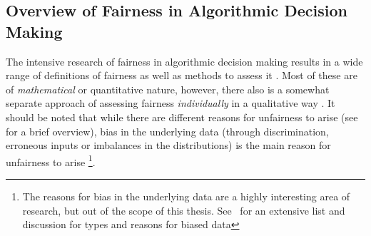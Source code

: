 \subsection{Overview of Fairness in Algorithmic Decision Making}\label{subsec:overview}

The intensive research of fairness in algorithmic decision making results in a wide range of definitions of fairness as well as methods to assess it \parencite{CorbettDavies2023}.
Most of these are of \textit{mathematical} or quantitative nature, however, there also is a somewhat separate approach of assessing fairness \textit{individually} in a qualitative way \parencite{Chouldechova2018}.
It should be noted that while there are different reasons for unfairness to arise (see~\cite{Chouldechova2018} for a brief overview), bias in the underlying data (through discrimination, erroneous inputs or imbalances in the distributions) 
is the main reason for unfairness to arise \parencite{Choras2020}\footnote{The reasons for bias in the underlying data are a highly interesting area of research, but out of the scope of this thesis. See~\cite{Mehrabi2021} for an extensive list and discussion for types and reasons for biased data}.
%
